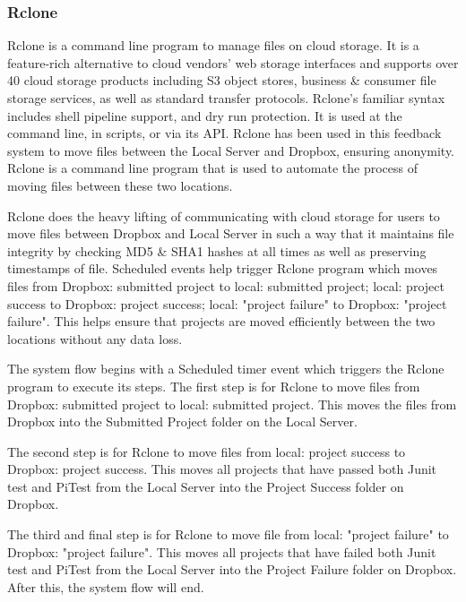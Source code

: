 \subsubsection{Rclone}
Rclone is a command line program to manage files on cloud storage. It is a feature-rich alternative to cloud vendors' web storage interfaces and supports over 40 cloud storage products including S3 object stores, business \& consumer file storage services, as well as standard transfer protocols. Rclone's familiar syntax includes shell pipeline support, and dry run protection. It is used at the command line, in scripts, or via its API. Rclone has been used in this feedback system to move files between the Local Server and Dropbox, ensuring anonymity. Rclone is a command line program that is used to automate the process of moving files between these two locations.\par  

Rclone does the heavy lifting of communicating with cloud storage for users to move files between Dropbox and Local Server in such a way that it maintains file integrity by checking MD5 & SHA1 hashes at all times as well as preserving timestamps of file. Scheduled events help trigger Rclone program which moves files from Dropbox: submitted project to local: submitted project; local: project success to Dropbox: project success; local: "project failure" to Dropbox: "project failure". This helps ensure that projects are moved efficiently between the two locations without any data loss.\par 

The system flow begins with a Scheduled timer event which triggers the Rclone program to execute its steps. The first step is for Rclone to move files from Dropbox: submitted project to local: submitted project. This moves the files from Dropbox into the Submitted Project folder on the Local Server. 

The second step is for Rclone to move files from local: project success to Dropbox: project success. This moves all projects that have passed both Junit test and PiTest from the Local Server into the Project Success folder on Dropbox.   

The third and final step is for Rclone to move file from local: "project failure" to Dropbox: "project failure". This moves all projects that have failed both Junit test and PiTest from the Local Server into the Project Failure folder on Dropbox. After this, the system flow will end.\par 

